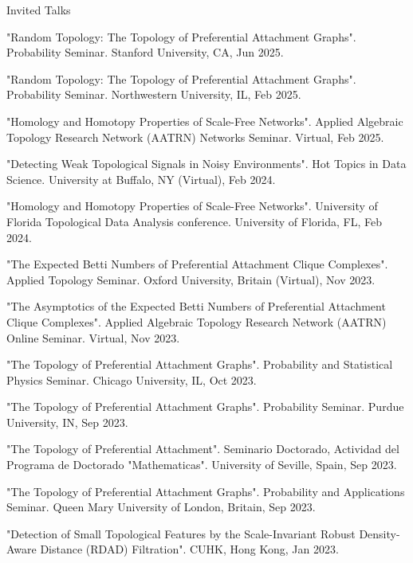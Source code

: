 \documentclass{resume} %
\begin{document}
\begin{rSection}{Invited Talks}

"Random Topology: The Topology of Preferential Attachment Graphs". Probability Seminar. Stanford University, CA, Jun 2025.

"Random Topology: The Topology of Preferential Attachment Graphs". Probability Seminar. Northwestern University, IL, Feb 2025.

"Homology and Homotopy Properties of Scale-Free Networks". Applied Algebraic Topology Research Network (AATRN) Networks Seminar. Virtual, Feb 2025.

"Detecting Weak Topological Signals in Noisy Environments". Hot Topics in Data Science. University at Buffalo, NY (Virtual), Feb 2024.

"Homology and Homotopy Properties of Scale-Free Networks". University of Florida Topological Data Analysis conference. University of Florida, FL, Feb 2024.

"The Expected Betti Numbers of Preferential Attachment Clique Complexes". Applied Topology Seminar. Oxford University, Britain (Virtual), Nov 2023.

"The Asymptotics of the Expected Betti Numbers of Preferential Attachment Clique Complexes". Applied Algebraic Topology Research Network (AATRN) Online Seminar. Virtual, Nov 2023.

"The Topology of Preferential Attachment Graphs". Probability and Statistical Physics Seminar. Chicago University, IL, Oct 2023.

"The Topology of Preferential Attachment Graphs". Probability Seminar. Purdue University, IN, Sep 2023.

"The Topology of Preferential Attachment". Seminario Doctorado, Actividad del Programa de Doctorado "Mathematicas". University of Seville, Spain, Sep 2023.

"The Topology of Preferential Attachment Graphs". Probability and Applications Seminar. Queen Mary University of London, Britain, Sep 2023.

"Detection of Small Topological Features by the Scale-Invariant Robust Density-Aware Distance (RDAD) Filtration". CUHK, Hong Kong, Jan 2023.

\end{rSection}
\end{document}
